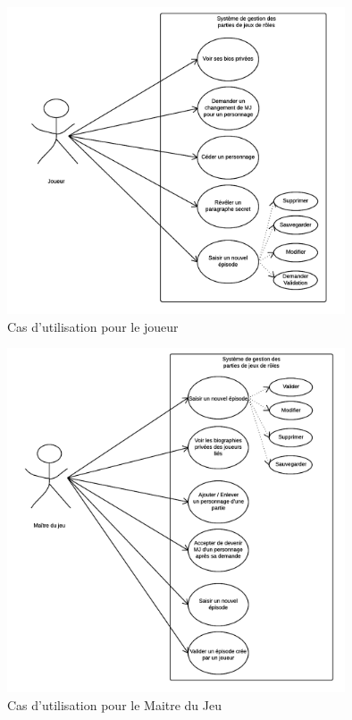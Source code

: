 \documentclass[a4paper,oneside,10pt]{article}
\begin{document}
\begin{figure}[H]
	\begin{center}
\includegraphics[width=10cm]{images/utilisation/JoueurCU.png}
	\caption{Cas d'utilisation pour le joueur}
\end{center}
\end{figure}
\begin{figure}[H]
	\begin{center}
\includegraphics[width=10cm]{images/utilisation/MJCU.png}  
	\caption{Cas d'utilisation pour le Maitre du Jeu}
\end{center}
\end{figure}
\end{document}
